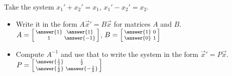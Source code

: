 \documentclass{ximera}
\begin{document}
\begin{exercise}
    Take the system $x_1' + x_2' = x_1$, $x_1' - x_2' = x_2$.
    \begin{itemize}
        \item Write it in the form $A {\vec{x}}' = B \vec{x}$ for matrices $A$ and $B$.\\
            $A = \left[\begin{smallmatrix}  \answer{1} & \answer{1} \\ 1 & \answer{-1} \end{smallmatrix}\right]$, $B = \left[\begin{smallmatrix} \answer{1} & 0 \\ \answer{0} & 1 \end{smallmatrix}\right]$
        \item Compute $A^{-1}$ and use that to write the system in the form ${\vec{x}}' = P \vec{x}$.\\
            $P = \left[\begin{smallmatrix} \answer{\frac{1}{2}} & \frac{1}{2} \\ \answer{\frac{1}{2}} & \answer{-\frac{1}{2}} \end{smallmatrix}\right]$
    \end{itemize}
\end{exercise}
\end{document}
